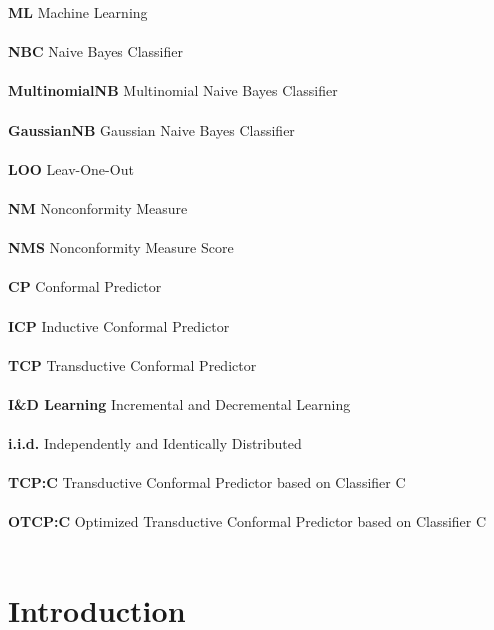 \documentclass[10pt]{reportMaster}
\begin{document}
\noindent \textbf{ML}  Machine Learning \\\\
\noindent \textbf{NBC}  Naive Bayes Classifier \\\\
\noindent \textbf{MultinomialNB} Multinomial Naive Bayes Classifier\\\\
\noindent \textbf{GaussianNB}  Gaussian Naive Bayes Classifier\\\\
\noindent \textbf{LOO} Leav-One-Out \\\\
\noindent \textbf{NM}  Nonconformity Measure \\\\
\noindent \textbf{NMS}  Nonconformity Measure Score \\\\
\noindent \textbf{CP}  Conformal Predictor \\\\
\noindent \textbf{ICP}  Inductive Conformal Predictor \\\\
\noindent \textbf{TCP}  Transductive Conformal Predictor \\\\
\noindent \textbf{I\&D Learning}  Incremental and Decremental Learning \\\\
\noindent \textbf{i.i.d.} Independently and Identically Distributed \\\\
\noindent \textbf{TCP:C} Transductive Conformal Predictor based on Classifier C\\\\
\noindent \textbf{OTCP:C} Optimized Transductive Conformal Predictor based on Classifier C\\\\




\chapter{Introduction}
\end{document}
